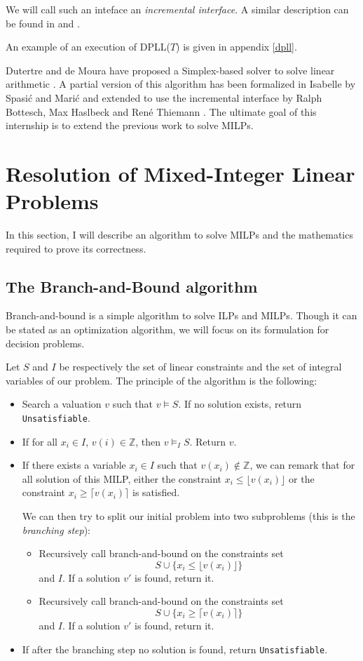 \documentclass{article}
\newcommand{\cunsat}{\texttt{Unsatisfiable}}
\newcommand{\ints}{\mathbb{Z}}
\begin{document}
We will call such an inteface an \textit{incremental interface}.
A similar description can be found in \cite{Dutertre2006} and
\cite{Thiemann2018}.

An example of an execution of DPLL($T$) is given in appendix \ref{dpll}.

Dutertre and de Moura have proposed a Simplex-based solver to solve linear
arithmetic \cite{Dutertre2006}. A partial version of this algorithm has been
formalized in Isabelle by Spasić and Marić \cite{Spasic2012} and extended to
use the incremental interface by Ralph Bottesch, Max Haslbeck and René Thiemann
\cite{Thiemann2018}. The ultimate goal of this internship is to extend the
previous work to solve MILPs.

\section{Resolution of Mixed-Integer Linear Problems}
In this section, I will describe an algorithm to solve MILPs and the mathematics
required to prove its correctness.

\subsection{The Branch-and-Bound algorithm}
\label{bbdescr}
Branch-and-bound is a simple algorithm to solve ILPs and MILPs. Though it can be
stated as an optimization algorithm, we will focus on its formulation for
decision problems.

Let $S$ and $I$ be respectively the set of linear constraints and the set of
integral variables of our problem. The principle of the algorithm is the
following:
\begin{itemize}
  \item Search a valuation $v$ such that $v \vDash S$. If no solution exists,
    return \cunsat{}.
  \item If for all $x_i \in I$, $v(i) \in \ints$, then $v \vDash_I S$.
    Return $v$.
  \item If there exists a variable $x_i \in I$ such that
    $v(x_i) \notin \ints$, we can remark that for all solution of this
    MILP, either the constraint $x_i \leqslant \lfloor v(x_i) \rfloor$ 
    or the constraint $x_i \geqslant \lceil v(x_i) \rceil$ is satisfied.
    
    We can then try to split our initial problem into two subproblems (this is
    the \textit{branching step}):
    \begin{itemize}
      \item Recursively call branch-and-bound on the constraints set
        $$S \cup \{x_i \leqslant \lfloor v(x_i) \rfloor\}$$ and $I$.
        If a solution $v'$ is found, return it.
      \item Recursively call branch-and-bound on the constraints set
        $$S \cup \{x_i \geqslant \lceil v(x_i) \rceil\}$$ and $I$.
        If a solution $v'$ is found, return it.
    \end{itemize}
  \item If after the branching step no solution is found, return \cunsat{}.
\end{itemize}
\end{document}
